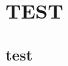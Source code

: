 \documentclass[12pt, a4paper]{report}
\begin{document}
	
	\chapter{TEST}
	
	\section{test}
\end{document}
